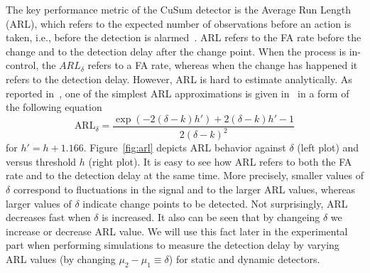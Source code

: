 The key performance metric of the CuSum detector is the Average Run Length (ARL), which refers to the expected number of observations before an action is taken, i.e., before the detection is alarmed~\cite{Page1954}.
ARL refers to the FA rate before the change and to the detection delay after the change point.
When the process is in-control, the $ARL_{\delta}$ refers to a FA rate, whereas when the change has happened it refers to the detection delay.
However, ARL is hard to estimate analytically.
As reported in~\cite{plasse2021streaming}, one of the simplest ARL approximations is given in~\cite{siegmund2013sequential} in a form of the following equation %
\begin{equation}\label{eq:arl_approximation}
	\text{ARL}_{\delta} = \frac{\exp(-2(\delta-k)h') + 2(\delta - k)h' -1}{2 (\delta - k)^2}
\end{equation}
for $h' = h+1.166$.
Figure~\ref{fig:arl} depicts ARL behavior against $\delta$ (left plot) and versus threshold $h$ (right plot).
It is easy to see how ARL refers to both the FA rate and to the detection delay at the same time.
More precisely, smaller values of $\delta$ correspond to fluctuations in the signal and to the larger ARL values, whereas
larger values of $\delta$ indicate change points to be detected.
Not surprisingly, ARL decreases fast when $\delta$ is increased.
It also can be seen that by changeing $\delta$ we increase or decrease ARL value.
We will use this fact later in the experimental part when performing simulations to measure the detection delay by varying ARL values (by changing $\mu_2-\mu_1 \equiv \delta$) for static and dynamic detectors.
%
